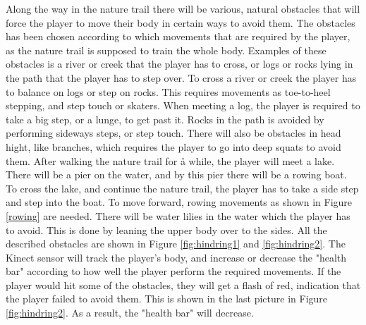 Along the way in the nature trail there will be various, natural obstacles that will force the player to move their body in certain ways to avoid them. The obstacles has been chosen according to which movements that are required by the player, as the nature trail is supposed to train the whole body. Examples of these obstacles is a river or creek that the player has to cross, or logs or rocks lying in the path that the player has to step over. To cross a river or creek the player has to balance on logs or step on rocks. This requires movements as toe-to-heel stepping, and step touch or skaters. When meeting a log, the player is required to take a big step, or a lunge, to get past it. Rocks in the path is avoided by performing sideways steps, or step touch. There will also be obstacles in head hight, like branches, which requires the player to go into deep squats to avoid them. After walking the nature trail for å while, the player will meet a lake. There will be a pier on the water, and by this pier there will be a rowing boat. To cross the lake, and continue the nature trail, the player has to take a side step and step into the boat. To move forward, rowing movements as shown in Figure \ref{rowing} are needed. There will be water lilies in the water which the player has to avoid. This is done by leaning the upper body over to the sides. All the described obstacles are shown in Figure \ref{fig:hindring1} and \ref{fig:hindring2}. The Kinect sensor will track the player's body, and increase or decrease the "health bar" according to how well the player perform the required movements. If the player would hit some of the obstacles, they will get a flash of red, indication that the player failed to avoid them. This is shown in the last picture in Figure \ref{fig:hindring2}. As a result, the "health bar" will decrease.     


